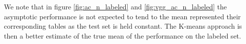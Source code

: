 We note that in figure \ref{fig:ac_n_labeled} and \ref{fig:vgg_ac_n_labeled} the asymptotic performance is not expected to tend to the mean represented their corresponding tables as the test set is held constant. The K-means approach is then a better estimate of the true mean of the performance on the labeled set.





